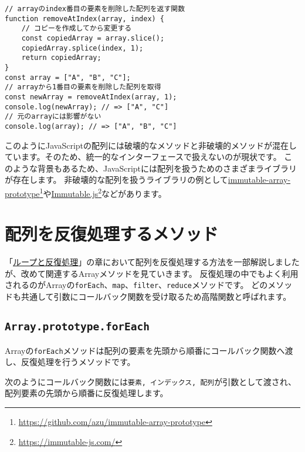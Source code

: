 \begin{lstlisting}
// arrayのindex番目の要素を削除した配列を返す関数
function removeAtIndex(array, index) {
    // コピーを作成してから変更する
    const copiedArray = array.slice();
    copiedArray.splice(index, 1);
    return copiedArray;
}
const array = ["A", "B", "C"];
// arrayから1番目の要素を削除した配列を取得
const newArray = removeAtIndex(array, 1);
console.log(newArray); // => ["A", "C"]
// 元のarrayには影響がない
console.log(array); // => ["A", "B", "C"]
\end{lstlisting}

このようにJavaScriptの配列には破壊的なメソッドと非破壊的メソッドが混在しています。そのため、統一的なインターフェースで扱えないのが現状です。
このような背景もあるため、JavaScriptには配列を扱うためのさまざまライブラリが存在します。
非破壊的な配列を扱うライブラリの例として\href{https://github.com/azu/immutable-array-prototype}{immutable-array-prototype}\footnote{\url{https://github.com/azu/immutable-array-prototype}}や\href{https://immutable-js.com/}{Immutable.js}\footnote{\url{https://immutable-js.com/}}などがあります。

\hypertarget{array-iterate}{%
\section{配列を反復処理するメソッド}\label{array-iterate}}

「\hyperlink{loop-and-iteration}{ループと反復処理}」の章において配列を反復処理する方法を一部解説しましたが、改めて関連するArrayメソッドを見ていきます。
反復処理の中でもよく利用されるのがArrayの\texttt{forEach}、\texttt{map}、\texttt{filter}、\texttt{reduce}メソッドです。
どのメソッドも共通して引数にコールバック関数を受け取るため高階関数と呼ばれます。

\hypertarget{array-foreach}{%
\subsection{\texorpdfstring{\texttt{Array.prototype.forEach}}{Array.prototype.forEach}}\label{array-foreach}}

Arrayの\texttt{forEach}メソッドは配列の要素を先頭から順番にコールバック関数へ渡し、反復処理を行うメソッドです。

次のようにコールバック関数には\texttt{要素, インデックス, 配列}が引数として渡され、配列要素の先頭から順番に反復処理します。

